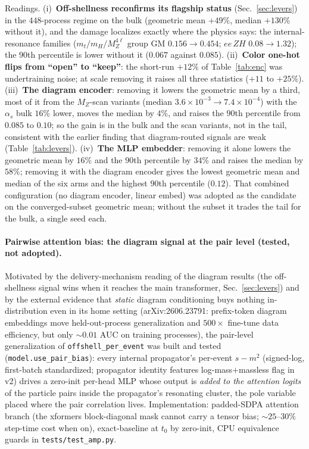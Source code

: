 \documentclass[11pt]{article}
\newcommand{\code}[1]{\texttt{#1}}
\begin{document}
Readings. (i)~\textbf{Off-shellness reconfirms its flagship status} (Sec.~\ref{sec:levers}) in the
$448$-process regime on the bulk (geometric mean $+49\%$, median $+130\%$ without it), and the
damage localizes exactly where the physics says: the internal-resonance families
($m_t/m_H/M_Z^{4\ell}$ group GM $0.156\!\to\!0.454$; $ee\,ZH$ $0.08\!\to\!1.32$); the $90$th
percentile is lower without it ($0.067$ against $0.085$). (ii)~\textbf{Color one-hot flips from
``open'' to ``keep''}: the short-run $+12\%$ of Table~\ref{tab:enc} was undertraining noise; at
scale removing it raises all three statistics ($+11$ to $+25\%$). (iii)~\textbf{The diagram
encoder}: removing it lowers the geometric mean by a third, most of it from the $M_Z$-scan
variants (median $3.6\times10^{-3}\to7.4\times10^{-4}$) with the $\alpha_s$ bulk $16\%$ lower,
moves the median by $4\%$, and raises the $90$th percentile from $0.085$ to $0.10$; so the
gain is in the bulk and the scan variants, not in the tail, consistent with the earlier finding
that diagram-routed signals are weak (Table~\ref{tab:levers}). (iv)~\textbf{The MLP embedder}:
removing it alone lowers the geometric mean by $16\%$ and the $90$th percentile by $34\%$ and
raises the median by $58\%$; removing it with the diagram encoder gives the lowest geometric
mean and median of the six arms and the highest $90$th percentile ($0.12$). That combined
configuration (no diagram encoder, linear embed) was adopted as the candidate on the
converged-subset geometric mean; without the subset it trades the tail for the bulk, a single
seed each.

\paragraph{Pairwise attention bias: the diagram signal at the pair level (tested, not adopted).}
Motivated by the delivery-mechanism reading of the diagram results (the off-shellness signal wins
when it reaches the main transformer, Sec.~\ref{sec:levers}) and by the external evidence that
\emph{static} diagram conditioning buys nothing in-distribution even in its home setting
(arXiv:2606.23791: prefix-token diagram embeddings move held-out-process generalization and
$500\times$ fine-tune data efficiency, but only $\sim\!0.01$ AUC on training processes), the
pair-level generalization of \code{offshell\_per\_event} was built and tested
(\code{model.use\_pair\_bias}): every internal propagator's per-event $s-m^2$ (signed-log,
first-batch standardized; propagator identity features log-mass$+$massless flag in v2) drives a
zero-init per-head MLP whose output is \emph{added to the attention logits} of the particle pairs
inside the propagator's resonating cluster, the pole variable placed where the pair
correlation lives. Implementation: padded-SDPA attention branch (the xformers block-diagonal mask
cannot carry a tensor bias; $\sim\!25$--$30\%$ step-time cost when on), exact-baseline at $t_0$ by
zero-init, CPU equivalence guards in \code{tests/test\_amp.py}.
\end{document}
